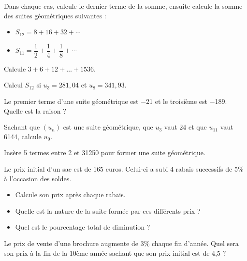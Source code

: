 \documentclass[a4paper,12pt]{report}
\begin{document}
\begin{exercice}
Dans chaque cas, calcule le dernier terme de la somme, ensuite calcule
la somme des suites géométriques suivantes :

\begin{itemize}
\item \(S_{12}=8+16+32+\cdots\)

\item \(S_{11}=\dfrac{1}{2}+\dfrac{1}{4}+\dfrac{1}{8}+\cdots\)
\end{itemize}
\end{exercice}

\begin{exercice}
Calcule \(3+6+12+\ldots+1536\).
\end{exercice}

\begin{exercice}
Calcul \(S_{12}\) si \(u_3=281,04\) et \(u_8=341,93\).
\end{exercice}

\begin{exercice}
Le premier terme d’une suite géométrique est −21 et le troisième est
−189. Quelle est la raison ?
\end{exercice}

\begin{exercice}
Sachant que \((u_n)\) est une suite géométrique, que \(u_3\) vaut 24 et
que \(u_{11}\) vaut 6144, calcule \(u_0\).
\end{exercice}

\begin{exercice}
Insère 5 termes entre 2 et 31250 pour former une suite géométrique.
\end{exercice}

\begin{exercice}
Le prix initial d’un sac est de 165 euros. Celui-ci a subi 4 rabais
successifs de 5\% à l’occasion des soldes.
\begin{itemize}
\item Calcule son prix après chaque rabais.
\item Quelle est la nature de la suite formée par ces différents prix ?
\item Quel est le pourcentage total de diminution ?
\end{itemize}
\end{exercice}

\begin{exercice}
Le prix de vente d’une brochure augmente de 3\% chaque fin d’année. Quel sera son
prix à la fin de la 10ème année sachant que son prix initial est de 4,5\texteuro{} ?
\end{exercice}
\end{document}
